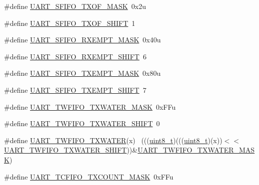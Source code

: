 \begin{DoxyCompactItemize}
\#define \hyperlink{group___u_a_r_t___register___masks_ga53e9575053054705318b25e04c5b0f62}{U\+A\+R\+T\+\_\+\+S\+F\+I\+F\+O\+\_\+\+T\+X\+O\+F\+\_\+\+M\+A\+SK}~0x2u
\item 
\#define \hyperlink{group___u_a_r_t___register___masks_ga8bcebdd37ab0f89f58d3533577756444}{U\+A\+R\+T\+\_\+\+S\+F\+I\+F\+O\+\_\+\+T\+X\+O\+F\+\_\+\+S\+H\+I\+FT}~1
\item 
\#define \hyperlink{group___u_a_r_t___register___masks_ga672339d2930ef7864126ea9938d2c18d}{U\+A\+R\+T\+\_\+\+S\+F\+I\+F\+O\+\_\+\+R\+X\+E\+M\+P\+T\+\_\+\+M\+A\+SK}~0x40u
\item 
\#define \hyperlink{group___u_a_r_t___register___masks_ga437bd92a0e905d88bf92615135b0672f}{U\+A\+R\+T\+\_\+\+S\+F\+I\+F\+O\+\_\+\+R\+X\+E\+M\+P\+T\+\_\+\+S\+H\+I\+FT}~6
\item 
\#define \hyperlink{group___u_a_r_t___register___masks_ga50a1813a0e695d319434adaa157a4c3a}{U\+A\+R\+T\+\_\+\+S\+F\+I\+F\+O\+\_\+\+T\+X\+E\+M\+P\+T\+\_\+\+M\+A\+SK}~0x80u
\item 
\#define \hyperlink{group___u_a_r_t___register___masks_ga1856b521baf09271f8085380ef6e1cc5}{U\+A\+R\+T\+\_\+\+S\+F\+I\+F\+O\+\_\+\+T\+X\+E\+M\+P\+T\+\_\+\+S\+H\+I\+FT}~7
\item 
\#define \hyperlink{group___u_a_r_t___register___masks_ga4d1d724beef4708553a5066491ebf32e}{U\+A\+R\+T\+\_\+\+T\+W\+F\+I\+F\+O\+\_\+\+T\+X\+W\+A\+T\+E\+R\+\_\+\+M\+A\+SK}~0x\+F\+Fu
\item 
\#define \hyperlink{group___u_a_r_t___register___masks_ga55b227e0cf4669aec87ec3fb3bb494c8}{U\+A\+R\+T\+\_\+\+T\+W\+F\+I\+F\+O\+\_\+\+T\+X\+W\+A\+T\+E\+R\+\_\+\+S\+H\+I\+FT}~0
\item 
\#define \hyperlink{group___u_a_r_t___register___masks_ga011857b26eaebbc7729e6e8d00e67b44}{U\+A\+R\+T\+\_\+\+T\+W\+F\+I\+F\+O\+\_\+\+T\+X\+W\+A\+T\+ER}(x)                                  ~(((\hyperlink{_p_e___types_8h_aba7bc1797add20fe3efdf37ced1182c5}{uint8\+\_\+t})(((\hyperlink{_p_e___types_8h_aba7bc1797add20fe3efdf37ced1182c5}{uint8\+\_\+t})(x))$<$$<$\hyperlink{group___u_a_r_t___register___masks_ga55b227e0cf4669aec87ec3fb3bb494c8}{U\+A\+R\+T\+\_\+\+T\+W\+F\+I\+F\+O\+\_\+\+T\+X\+W\+A\+T\+E\+R\+\_\+\+S\+H\+I\+FT}))\&\hyperlink{group___u_a_r_t___register___masks_ga4d1d724beef4708553a5066491ebf32e}{U\+A\+R\+T\+\_\+\+T\+W\+F\+I\+F\+O\+\_\+\+T\+X\+W\+A\+T\+E\+R\+\_\+\+M\+A\+SK})
\item 
\#define \hyperlink{group___u_a_r_t___register___masks_gab3c6a27ca034de86ac2aa4f5c55781f2}{U\+A\+R\+T\+\_\+\+T\+C\+F\+I\+F\+O\+\_\+\+T\+X\+C\+O\+U\+N\+T\+\_\+\+M\+A\+SK}~0x\+F\+Fu
$$
\end{DoxyCompactItemize}
